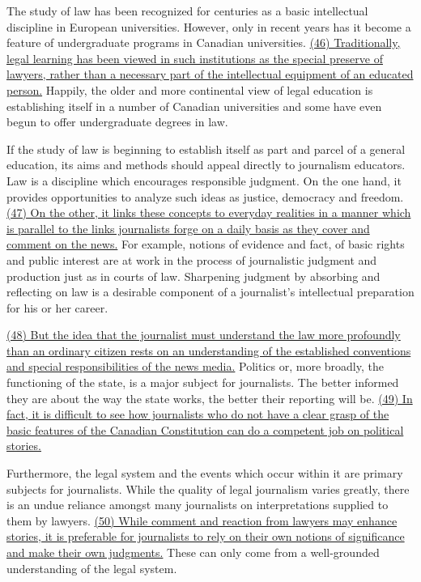 \qquad The study of law has been recognized for centuries as a basic intellectual discipline in European universities. However, only in recent years has it become a feature of undergraduate programs in Canadian universities. \ul{(46) Traditionally, legal learning has been viewed in such institutions as the special preserve of lawyers, rather than a necessary part of the intellectual equipment of an educated person.} Happily, the older and more continental view of legal education is establishing itself in a number of Canadian universities and some have even begun to offer undergraduate degrees in law.

\qquad If the study of law is beginning to establish itself as part and parcel of a general education, its aims and methods should appeal directly to journalism educators. Law is a discipline which encourages responsible judgment. On the one hand, it provides opportunities to analyze such ideas as justice, democracy and freedom. \ul{(47) On the other, it links these concepts to everyday realities in a manner which is parallel to the links journalists forge on a daily basis as they cover and comment on the news.} For example, notions of evidence and fact, of basic rights and public interest are at work in the process of journalistic judgment and production just as in courts of law. Sharpening judgment by absorbing and reflecting on law is a desirable component of a journalist’s intellectual preparation for his or her career.

\qquad \ul{(48) But the idea that the journalist must understand the law more profoundly than an ordinary citizen rests on an understanding of the established conventions and special responsibilities of the news media.} Politics or, more broadly, the functioning of the state, is a major subject for journalists. The better informed they are about the way the state works, the better their reporting will be. \ul{(49) In fact, it is difficult to see how journalists who do not have a clear grasp of the basic features of the Canadian Constitution can do a competent job on political stories.}

\qquad Furthermore, the legal system and the events which occur within it are primary subjects for journalists. While the quality of legal journalism varies greatly, there is an undue reliance amongst many journalists on interpretations supplied to them by lawyers. \ul{(50) While comment and reaction from lawyers may enhance stories, it is preferable for journalists to rely on their own notions of significance and make their own judgments.} These can only come from a well-grounded understanding of the legal system.